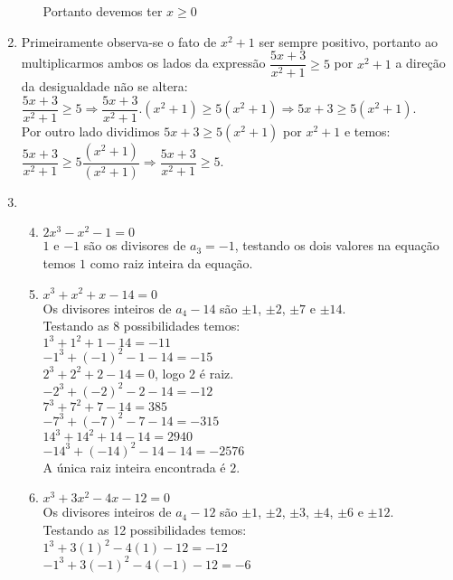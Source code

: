 \begin{enumerate}
\begin{enumerate}
		Portanto devemos ter $x \geq 0$
	\end{enumerate}
	\item %
	Primeiramente observa-se o fato de $x^2+1$ ser sempre positivo, portanto ao multiplicarmos ambos os lados da expressão $\dfrac{5x+3}{x^2+1} \geq 5$ por $x^2 + 1$ a direção da desigualdade não se altera:\\[6pt]
	$\dfrac{5x+3}{x^2+1} \geq 5 \Rightarrow \dfrac{5x+3}{x^2+1}.(x^2+1) \geq 5(x^2+1) \Rightarrow 5x+3 \geq 5(x^2+1)$.\\[6pt]
	Por outro lado dividimos $5x+3 \geq 5(x^2+1)$ por $x^2+1$ e temos:\\[6pt]
	$\dfrac{5x+3}{x^2+1} \geq 5\dfrac{(x^2+1)}{(x^2+1)} \Rightarrow \dfrac{5x+3}{x^2+1} \geq 5$.
	\setcounter{enumi}{16}
	\item %
		\begin{enumerate}
			\setcounter{enumii}{3}
			\item  %
			$2x^3-x^2-1=0$\\
			$1$ e $-1$ são os divisores de $a_{3}=-1$, testando os dois valores na equação temos $1$ como raiz inteira da equação.
			\item  %
			$x^3+x^2+x-14=0$\\
			Os divisores inteiros de $a_{4}-14$ são $\pm1$, $\pm2$, $\pm7$ e $\pm14$.\\
			Testando as 8 possibilidades temos:\\
			$1^3+1^2+1-14=-11$\\
			$-1^3+(-1)^2-1-14=-15$\\
			$2^3+2^2+2-14=0$, logo $2$ é raiz.\\
			$-2^3+(-2)^2-2-14=-12$\\
			$7^3+7^2+7-14=385$\\
			$-7^3+(-7)^2-7-14=-315$\\
			$14^3+14^2+14-14=2940$\\
			$-14^3+(-14)^2-14-14=-2576$\\
			A única raiz inteira encontrada é $2$.
			\item  %
			$x^3+3x^2-4x-12=0$\\
			Os divisores inteiros de $a_{4}-12$ são $\pm1$, $\pm2$, $\pm3$, $\pm4$, $\pm6$ e $\pm12$.\\
			Testando as 12 possibilidades temos:\\
			$1^3+3(1)^2-4(1)-12=-12$\\
			$-1^3+3(-1)^2-4(-1)-12=-6$\\

\end{enumerate}
\end{enumerate}
